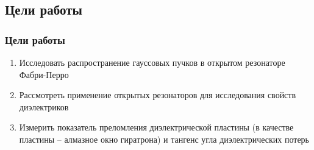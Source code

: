 \subsection{Цели работы}
\begin{frame}[t]
	\frametitle{Цели работы}
	\vfill
	\begin{spacing}{1}
		\begin{enumerate}
			\item Исследовать распространение гауссовых пучков в открытом резонаторе Фабри-Перро
			\item Рассмотреть применение открытых резонаторов для исследования свойств диэлектриков 
			\item Измерить показатель преломления диэлектрической пластины (в качестве пластины -- алмазное окно гиратрона) и тангенс угла диэлектрических потерь
		\end{enumerate}
	\end{spacing}
	\vfill
\end{frame}

